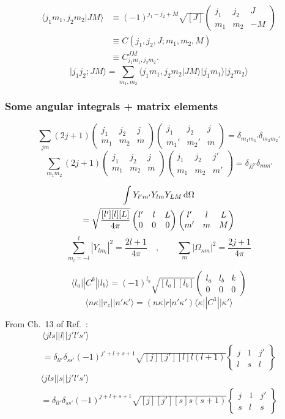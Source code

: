 \documentclass[10pt,twocolumn,a4paper]{article}%
\newcommand{\bra}[1]{\ensuremath{\langle #1|}}	%
\newcommand{\ket}[1]{\ensuremath{|#1\rangle}}	%
\newcommand{\braket}[1]{\ensuremath{\langle #1\rangle}}	%
\newcommand{\threej}[6]{\ensuremath{\begin{pmatrix}#1&#2&#3\\#4&#5&#6\end{pmatrix}}}	%
\newcommand{\sixj}[6]{\ensuremath{\begin{Bmatrix}#1&#2&#3\\#4&#5&#6\end{Bmatrix}}}	%
\newcommand{\be}{\begin{equation}}
\newcommand{\ee}{\end{equation}}
\def\d{\ensuremath{{\rm d}}}
\renewcommand{\k}{\ensuremath{\kappa}}
\begin{document}
\begin{align}
\braket{j_1 m_1,j_2m_2|JM} &\equiv (-1)^{j_1-j_2+M}\sqrt{[J]}\threej{j_1}{j_2}{J}{m_1}{m_2}{-M}\\
&\equiv C(j_1,j_2,J; m_1, m_2, M)\\
&\equiv C^{JM}_{j_1m_1,j_2m_2}.
\end{align}
\be
\ket{j_1 j_2;JM} =\sum_{m_1,m_2} \braket{j_1 m_1,j_2m_2|JM} \ket{j_1m_1}\ket{j_2m_2}
\ee






\subsubsection*{Some angular integrals + matrix elements}


\be
\sum_{jm}(2j+1)\threej{j_1}{j_2}{j}{m_1}{m_2}{m}\threej{j_1}{j_2}{j}{m_1'}{m_2'}{m} = \delta_{m_1m_1'}\delta_{m_2m_2'}
\ee
\be
\sum_{m_1m_2}(2j+1)\threej{j_1}{j_2}{j}{m_1}{m_2}{m}\threej{j_1}{j_2}{j'}{m_1}{m_2}{m'} = \delta_{jj'}\delta_{mm'}
\ee



\begin{multline}
\int Y_{l'm'}Y_{lm}Y_{LM}\,\d \Omega \\= \sqrt{\frac{[l'][l][L]}{4\pi}}\threej{l'}{l}{L}{0}{0}{0}\threej{l'}{l}{L}{m'}{m}{M}
\end{multline}
\be
\sum_{m_l=-l}^l |Y_{lm_l}|^2 = \frac{2l+1}{4\pi}\quad,\qquad \sum_m |\Omega_{\k m}|^2 = \frac{2j+1}{4\pi}
\ee



\be
\bra{l_a}|C^k|\ket{l_b} = (-1)^{l_a}\sqrt{[l_a][l_b]}\threej{l_a}{l_b}{k}{0}{0}{0}
\ee
%
\be
\bra{n\k}|r_z|\ket{n'\k'} = ({n\k}|r|{n'\k'})\bra{\k}|C^1|\ket{\k'}
\ee



From Ch.~13 of Ref.~\cite{Varshalovich1988}:
\begin{multline}
\bra{jls}|l|\ket{j'l's'} \\= \delta_{ll'}\delta_{ss'}(-1)^{j'+l+s+1}\sqrt{[j][j'][l]l(l+1)}\sixj{j}{1}{j'}{l}{s}{l}
\end{multline}
%
\begin{multline}
\bra{jls}|s|\ket{j'l's'} \\= \delta_{ll'}\delta_{ss'}(-1)^{j+l+s+1}\sqrt{[j][j'][s]s(s+1)}\sixj{j}{1}{j'}{s}{l}{s}
\end{multline}
\end{document}
